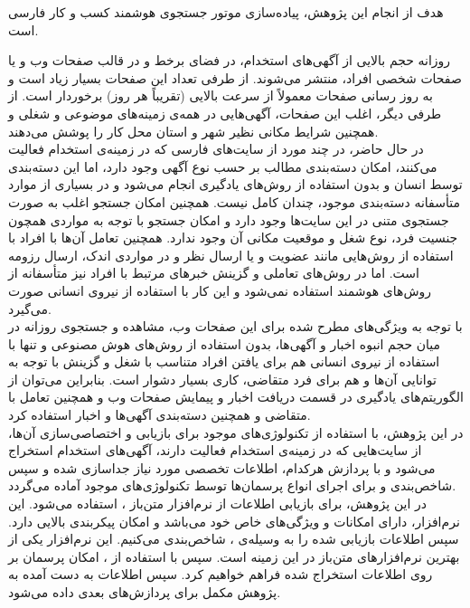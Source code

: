 
هدف از انجام این پژوهش، پیاده‌سازی موتور جستجوی هوشمند کسب و کار فارسی است.

روزانه حجم بالایی از آگهی‌های استخدام، در فضای برخط و در قالب صفحات وب و یا صفحات شخصی افراد، منتشر می‌شوند. از طرفی تعداد این صفحات بسیار زیاد است و به روز رسانی صفحات معمولاً از سرعت بالایی (تقریباً هر روز) برخوردار است. از طرفی دیگر، اغلب این صفحات، آگهی‌هایی در همه‌ی زمینه‌های موضوعی و شغلی و همچنین شرایط مکانی نظیر شهر و استان محل کار را پوشش می‌دهند.
\\
در حال حاضر، در چند مورد از سایت‌های فارسی که در زمینه‌ی استخدام فعالیت می‌کنند، امکان دسته‌بندی مطالب بر حسب نوع آگهی وجود دارد، اما این دسته‌بندی توسط انسان و بدون استفاده از روش‌های یادگیری انجام می‌شود و در بسیاری از موارد متأسفانه دسته‌بندی موجود، چندان کامل نیست. همچنین امکان جستجو اغلب به صورت جستجوی متنی در این سایت‌ها وجود دارد و امکان جستجو با توجه به مواردی همچون جنسیت فرد، نوع شغل و موقعیت مکانی آن وجود ندارد. همچنین تعامل آن‌ها با افراد با استفاده از روش‌هایی مانند عضویت و یا ارسال نظر و در مواردی اندک، ارسال رزومه است. اما در روش‌های تعاملی و گزینش خبرهای مرتبط با افراد نیز متأسفانه از روش‌های هوشمند استفاده نمی‌شود و این کار با استفاده از نیروی انسانی صورت می‌گیرد.
\\
با توجه به ویژگی‌های مطرح شده برای این صفحات وب، مشاهده و جستجوی روزانه در میان حجم انبوه اخبار و آگهی‌ها، بدون استفاده از روش‌های هوش مصنوعی و تنها با استفاده از نیروی انسانی هم برای یافتن افراد متناسب با شغل و گزینش با توجه به توانایی آن‌ها و هم برای فرد متقاضی، کاری بسیار دشوار است. بنابراین می‌توان از الگوریتم‌های یادگیری در قسمت دریافت اخبار و پیمایش صفحات وب و همچنین تعامل با متقاضی و همچنین دسته‌بندی آگهی‌ها و اخبار استفاده کرد.
\\
در این پژوهش، با استفاده از تکنولوژی‌های موجود برای بازیابی و اختصاصی‌سازی آن‌ها، از سایت‌هایی که در زمینه‌ی استخدام فعالیت دارند، آگهی‌های استخدام استخراج می‌شود و با پردازش هرکدام، اطلاعات تخصصی مورد نیاز جداسازی شده و سپس شاخص‌بندی و برای اجرای انواع پرسمان‌ها توسط تکنولوژی‌های موجود آماده می‌گردد.
\\
در این پژوهش، برای بازیابی اطلاعات از نرم‌افزار متن‌باز ، استفاده می‌شود. این نرم‌افزار، دارای امکانات و ویژگی‌های خاص خود می‌باشد و امکان پیکربندی بالایی دارد. سپس اطلاعات بازیابی شده را به وسیله‌ی ، شاخص‌بندی می‌کنیم. این نرم‌افزار یکی از بهترین نرم‌افزارهای متن‌باز در این زمینه است. سپس با استفاده از ، امکان پرسمان بر روی اطلاعات استخراج شده فراهم خواهیم کرد. سپس اطلاعات به دست آمده به پژوهش مکمل برای پردازش‌های بعدی داده می‌شود.
